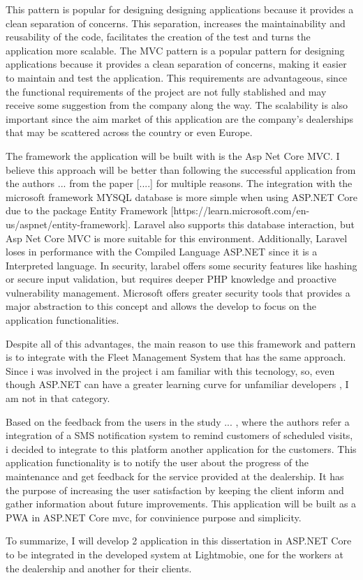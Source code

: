 This pattern is popular for designing designing applications because it provides a clean separation of concerns. This separation, increases the maintainability and reusability of the code, facilitates the creation of the test and turns the application more scalable. \cite{mvc_geeksforgeeks} \cite{MVC_StartupHouse}
The \ac{MVC} pattern is a popular pattern for designing applications because it provides a clean separation of concerns, making it easier to maintain and test the application. \cite{mvc_geeksforgeeks} \cite{MVC_StartupHouse}
This requirements are advantageous, since the functional requirements of the project are not fully stablished and may receive some suggestion from the company along the way. 
The scalability is also important since the aim market of this application are the company's dealerships that may be scattered across the country or even Europe.

The framework the application will be built with is the Asp Net Core MVC. 
I believe this approach will be better than following the successful application from the authors ... from the paper [....] for multiple reasons.
The integration with the microsoft framework MYSQL database is more simple when using ASP.NET Core due to the package Entity Framework [https://learn.microsoft.com/en-us/aspnet/entity-framework]. 
Laravel also supports this database interaction, but Asp Net Core MVC is more suitable for this environment. \cite{asp_net_vs_laravel}
Additionally, Laravel loses in performance with the Compiled Language ASP.NET since it is a Interpreted language. 
In security, larabel offers some security features like hashing or secure input validation, but requires deeper PHP knowledge and proactive vulnerability management. 
Microsoft offers greater security tools that provides a major abstraction to this concept and allows the develop to focus on the application functionalities. \cite{asp_net_vs_laravel}

Despite all of this advantages, the main reason to use this framework and pattern is to integrate with the Fleet Management System that has the same approach. 
Since i was involved in the project i am familiar with this tecnology, so, even though ASP.NET can have a greater learning curve for unfamiliar developers \cite{asp_net_vs_laravel}, I am not in that category.

Based on the feedback from the users in the study ... \cite{MARS_MOTORS}, where the authors refer a integration of a SMS notification system to remind customers of scheduled visits, i decided to integrate to this platform another application for the customers. 
This application functionality is to notify the user about the progress of the maintenance and get feedback for the service provided at the dealership.
It has the purpose of increasing the user satisfaction by keeping the client inform and gather information about future improvements.
This application will be built as a \ac{PWA} in ASP.NET Core mvc, for convinience purpose and simplicity.

To summarize, I will develop 2 application in this dissertation in ASP.NET Core to be integrated in the developed system at Lightmobie, one for the workers at the dealership and another for their clients.







